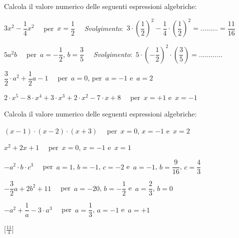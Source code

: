 \begin{esercizio}
\label{ese:8.20}
Calcola il valore numerico delle seguenti espressioni algebriche:
 \begin{enumeratea}
\spazielenx
 \item $3x^{2}-\dfrac{1}{4}x^{2}\quad$ per~$x=\dfrac{1}{2}\quad$ 
\emph{Svolgimento}:~$3\cdot \left(\dfrac{1}{2}\right)^{2}-\dfrac{1}{4}\cdot 
\left(\dfrac{1}{2}\right)^{2}=\ldots \ldots \ldots =\dfrac{11}{16}$
 \item $5a^{2}b\quad$ per~$a=-{\dfrac{1}{2}}$, $b=\dfrac{3}{5}\quad$ 
\emph{Svolgimento}:~$5\cdot \left(-{\dfrac{1}{2}}\right)^{2}\cdot 
\left(\dfrac{3}{5}\right)=\ldots \ldots \ldots \ldots $
 \item $\dfrac{3}{2}\cdot a^{2}+\dfrac{1}{2}a-1\quad$ per~$a=0$, per~$a=-1$ 
e~$a=2$
 \item $2\cdot x^{5}-8\cdot x^{4}+3\cdot x^{3}+2\cdot x^{2}-7\cdot x+8\quad$ 
per~$x=+1$ e~$x=-1$
 \end{enumeratea}
\end{esercizio}

\begin{esercizio}
\label{ese:8.21}
Calcola il valore numerico delle seguenti espressioni algebriche:
 \begin{enumeratea}
\spazielenx
 \item $(x-1)\cdot (x-2)\cdot (x+3)\quad$ per~$x=0$, $x= -1$ e~$x= 2$
 \item $x^{2}+2x+1\quad$ per~$x=0$, $x= -1$ e~$x= 1$
 \item $-a^{2}\cdot b\cdot c^{3}\quad$ per~$a=1$, $b=-1$, $c=-2$ e~$a=-1$, 
$b=\dfrac{9}{16}$, $c=\dfrac{4}{3}$
 \item $-{\dfrac{3}{2}}a+2b^{2}+11\quad$ per~$a=-20$, $b=-{\dfrac{1}{2}}$ 
e~$a=\dfrac{2}{3}$, $b=0$
 \item $-a^{2}+\dfrac{1}{a}-3\cdot a^{3}\quad$ per~$a=\dfrac{1}{3}$, $a=-1$ 
e~$a=+1$
 \end{enumeratea}
\end{esercizio}

\hfill[$\frac{11}{4}$]

